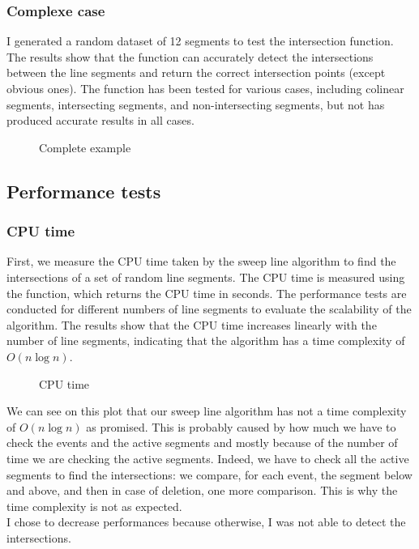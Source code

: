 \documentclass[10pt,a4paper,hidelinks]{article}
\begin{document}
\subsubsection{Complexe case}
I generated a random dataset of 12 segments to test the intersection function. The results show that the function can accurately detect the intersections between the line segments and return the correct intersection points (except obvious ones). The function has been tested for various cases, including colinear segments, intersecting segments, and non-intersecting segments, but not has produced accurate results in all cases.
\begin{figure}[h]
    \centering
    
    \caption{Complete example}
\end{figure}

\subsection{Performance tests}
\subsubsection{CPU time}
First, we measure the CPU time taken by the sweep line algorithm to find the intersections of a set of random line segments. The CPU time is measured using the  function, which returns the CPU time in seconds. The performance tests are conducted for different numbers of line segments to evaluate the scalability of the algorithm. The results show that the CPU time increases linearly with the number of line segments, indicating that the algorithm has a time complexity of $O(n \log n)$.

\begin{figure}[h]
    \centering
    
    \caption{CPU time}
\end{figure}
We can see on this plot that our sweep line algorithm has not a time complexity of $O(n \log n)$ as promised. This is probably caused by how much we have to check the events and the active segments and mostly because of the number of time we are checking the active segments. Indeed, we have to check all the active segments to find the intersections: we compare, for each event, the segment below and above, and then in case of deletion, one more comparison. This is why the time complexity is not as expected.\\
I chose to decrease performances because otherwise, I was not able to detect the intersections.
\end{document}
